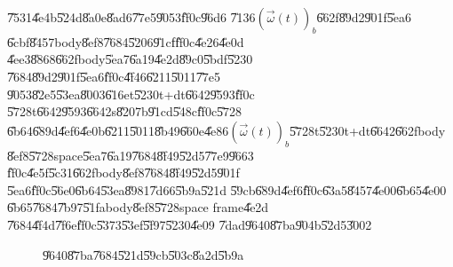 \documentclass[12pt]{article}
\begin{document}
\U{7531}\U{4e4b}\U{524d}\U{8a0e}\U{8ad6}\U{77e5}\U{9053}\U{ff0c}\U{96d6}%
\U{7136}$\left( \vec{\omega}(t)\right) _{b}$\U{662f}\U{89d2}\U{901f}\U{5ea6}%
\U{6cbf}\U{8457}body\U{8ef8}\U{7684}\U{5206}\U{91cf}\U{ff0c}\U{4e26}\U{4e0d}%
\U{4ee3}\U{8868}\U{662f}body\U{5ea7}\U{6a19}\U{4e2d}\U{89c0}\U{5bdf}\U{5230}%
\U{7684}\U{89d2}\U{901f}\U{5ea6}\U{ff0c}\U{4f46}\U{6211}\U{5011}\U{77e5}%
\U{9053}\U{82e5}\U{53ea}\U{8003}\U{616e}t\U{5230}t+dt\U{6642}\U{9593}\U{ff0c}%
\U{5728}t\U{6642}\U{9593}\U{6642}s\U{8207}b\U{91cd}\U{548c}\U{ff0c}\U{5728}%
\U{6b64}\U{689d}\U{4ef6}\U{4e0b}\U{6211}\U{5011}\U{8b49}\U{660e}\U{4e86}$%
\left( \vec{\omega}(t)\right) _{b}$\U{5728}t\U{5230}t+dt\U{6642}\U{662f}body%
\U{8ef8}\U{5728}space\U{5ea7}\U{6a19}\U{7684}\U{8f49}\U{52d5}\U{77e9}\U{9663}%
\U{ff0c}\U{4e5f}\U{5c31}\U{662f}body\U{8ef8}\U{7684}\U{8f49}\U{52d5}\U{901f}%
\U{5ea6}\U{ff0c}\U{56e0}\U{6b64}\U{53ea}\U{8981}\U{7d66}\U{5b9a}\U{521d}%
\U{59cb}\U{689d}\U{4ef6}\U{ff0c}\U{63a5}\U{8457}\U{4e00}\U{6b65}\U{4e00}%
\U{6b65}\U{7684}\U{7b97}\U{51fa}body\U{8ef8}\U{5728}space frame\U{4e2d}%
\U{7684}\U{4f4d}\U{7f6e}\U{ff0c}\U{5373}\U{53ef}\U{5f97}\U{5230}\U{4e09}%
\U{7dad}\U{9640}\U{87ba}\U{904b}\U{52d5}\U{3002}\bigskip

\begin{figure}[th]
\caption{\U{9640}\U{87ba}\U{7684}\U{521d}\U{59cb}\U{503c}\U{8a2d}\U{5b9a}}
\begin{center}
\end{center}
\end{figure}
\end{document}
